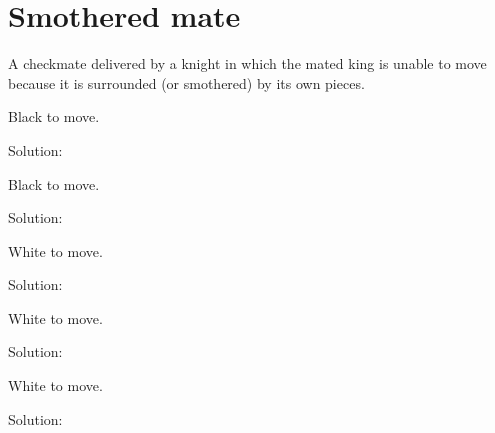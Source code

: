\documentclass{book}
\begin{document}
\section{Smothered mate}
A checkmate delivered by a knight in which the mated king is unable to move because it is surrounded (or smothered) by its own pieces.\begin{multicols}{2} 
\begin{samepage} 
\newgame 


 
\showboard
 
 Black to move. 
 
Solution: 
 
\end{samepage}\begin{samepage} 
\newgame 


 
\showboard
 
 Black to move. 
 
Solution: 
 
\end{samepage}\begin{samepage} 
\newgame 


 
\showboard
 
 White to move. 
 
Solution: 
 
\end{samepage}\begin{samepage} 
\newgame 


 
\showboard
 
 White to move. 
 
Solution: 
 
\end{samepage}\begin{samepage} 
\newgame 


 
\showboard
 
 White to move. 
 
Solution: 
 
\end{samepage}\end{multicols} 
\newpage 
\end{document}
